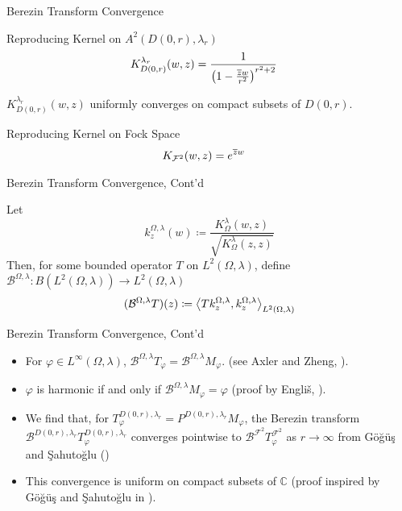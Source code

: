 \documentclass{reu_beamer}
\begin{document}
\begin{frame}{Berezin Transform Convergence}
    \begin{block}{Reproducing Kernel on $A^{2}\left(D(0,r),\lambda_r\right)$}
        \begin{align*}
            K_{D(0,r)}^{\lambda_r}(w, z) &= \frac{1}{\left(1 - \frac{\overline{z}w}{r^2}\right)^{r^2 + 2}}
        \end{align*}
    \end{block}
    $K_{D(0,r)}^{\lambda_r}(w, z)$ uniformly converges on compact subsets of $D(0,r)$.
    \begin{block}{Reproducing Kernel on Fock Space}
        \begin{align*}
            K_{\mathcal{F}^2}(w,z) &= e^{\overline{z}w}
        \end{align*}
    \end{block}
\end{frame}
\begin{frame}{Berezin Transform Convergence, Cont'd}
    \begin{definition}
        Let
        \[k^{\Omega, \lambda}_z(w) \coloneq \frac{K_\Omega^ \lambda(w, z)}{\sqrt{K_\Omega^ \lambda(z, z)}}\]
        Then, for some bounded operator $T$ on \(L^2(\Omega, \lambda)\), define \(\mathcal{B}^{\Omega, \lambda} : B(L^2(\Omega, \lambda)) \to L^2(\Omega, \lambda)\)
        \[(\mathcal{B}^{\Omega, \lambda}T)(z) \coloneq \left\langle T k^{\Omega, \lambda}_z, k^{\Omega, \lambda}_z\right\rangle_{L^2(\Omega, \lambda)}\]
    \end{definition}
\end{frame}
\begin{frame}{Berezin Transform Convergence, Cont'd}
\begin{itemize}
    \item For $\varphi \in L^{\infty}(\Omega,\lambda)$, $\mathcal{B}^{\Omega,\lambda}T_{\varphi} = \mathcal{B}^{\Omega,\lambda}M_\varphi$. (see Axler and Zheng, \cite{AxlerZhengToeplitzOperators}).
    \item $\varphi$ is harmonic if and only if $\mathcal{B}^{\Omega,\lambda} M_\varphi = \varphi$  (proof by Engli\v s, \cite{EnglisHarmonicFunctions}).
    \item We find that, for $T^{D(0,r), \lambda_r}_{\varphi} = P^{D(0,r), \lambda_r}M_{\varphi}$, the Berezin transform $\mathcal{B}^{D(0,r), \lambda_r}T^{D(0,r), \lambda_r}_\varphi$ converges pointwise to $\mathcal{B}^{\mathcal{F}^2}T^{\mathcal{F}^2}_{\varphi}$ as $r\rightarrow\infty$ from G\"{o}\u{g}\"{u}\c{s} and \c{S}ahuto\u{g}lu (\cite{SahutogluGogus2020})
    \item This convergence is uniform on compact subsets of $\mathbb{C}$ (proof inspired by G\"{o}\u{g}\"{u}\c{s} and \c{S}ahuto\u{g}lu in \cite{SahutogluGogus2020}).
\end{itemize}
\end{frame}
\end{document}
